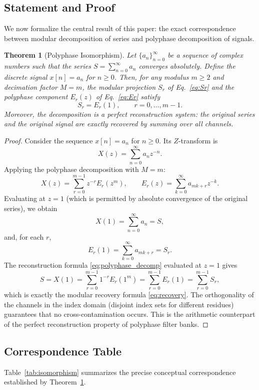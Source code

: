 \documentclass{mcom-l} %
\theoremstyle{plain} %
\newtheorem{theorem}{Theorem}[section]
\theoremstyle{definition} %
\theoremstyle{remark} %
\begin{document}
\subsection{Statement and Proof}
We now formalize the central result of this paper: the exact correspondence between modular decomposition of series and polyphase decomposition of signals.

\begin{theorem}[Polyphase Isomorphism]
\label{thm:isomorphism}
Let \(\{a_n\}_{n=0}^{\infty}\) be a sequence of complex numbers such that the series \(S = \sum_{n=0}^{\infty} a_n\) converges absolutely. Define the discrete signal \(x[n] = a_n\) for \(n \ge 0\). Then, for any modulus \(m \ge 2\) and decimation factor \(M = m\), the modular projection \(S_r\) of Eq.~\eqref{eq:Sr} and the polyphase component \(E_r(z)\) of Eq.~\eqref{eq:Er} satisfy
\begin{equation}
S_r = E_r(1), \qquad r = 0, \dots, m-1.
\label{eq:equality}
\end{equation}
Moreover, the decomposition is a perfect reconstruction system: the original series and the original signal are exactly recovered by summing over all channels.
\end{theorem}

\begin{proof}
Consider the sequence \(x[n] = a_n\) for \(n \ge 0\). Its \(Z\)-transform is
\[
X(z) = \sum_{n=0}^{\infty} a_n z^{-n}.
\]
Applying the polyphase decomposition with \(M = m\):
\[
X(z) = \sum_{r=0}^{m-1} z^{-r} E_r(z^m), \qquad E_r(z) = \sum_{k=0}^{\infty} a_{mk+r} z^{-k}.
\]
Evaluating at \(z = 1\) (which is permitted by absolute convergence of the original series), we obtain
\[
X(1) = \sum_{n=0}^{\infty} a_n = S,
\]
and, for each \(r\),
\[
E_r(1) = \sum_{k=0}^{\infty} a_{mk+r} = S_r.
\]
The reconstruction formula \eqref{eq:polyphase_decomp} evaluated at \(z=1\) gives
\[
S = X(1) = \sum_{r=0}^{m-1} 1^{-r} E_r(1^m) = \sum_{r=0}^{m-1} E_r(1) = \sum_{r=0}^{m-1} S_r,
\]
which is exactly the modular recovery formula \eqref{eq:recovery}. The orthogonality of the channels in the index domain (disjoint index sets for different residues) guarantees that no cross-contamination occurs. This is the arithmetic counterpart of the perfect reconstruction property of polyphase filter banks.
\end{proof}

\subsection{Correspondence Table}
Table~\ref{tab:isomorphism} summarizes the precise conceptual correspondence established by Theorem~\ref{thm:isomorphism}.
\end{document}
